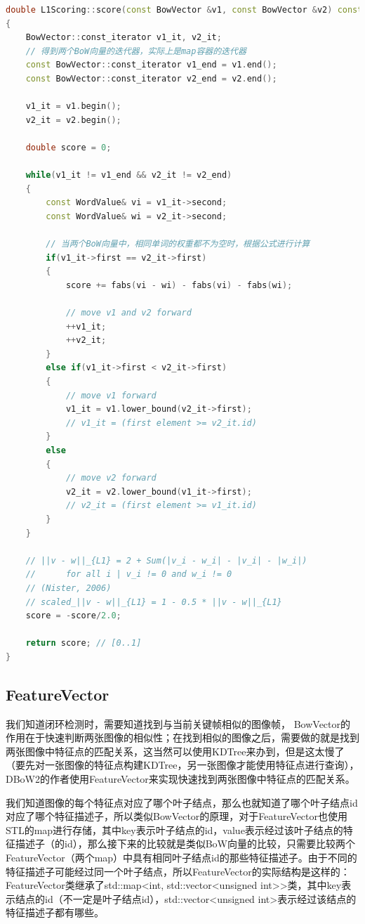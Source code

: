 \begin{lstlisting}[language = C++]
double L1Scoring::score(const BowVector &v1, const BowVector &v2) const
{
	BowVector::const_iterator v1_it, v2_it;
	// 得到两个BoW向量的迭代器，实际上是map容器的迭代器
	const BowVector::const_iterator v1_end = v1.end();
	const BowVector::const_iterator v2_end = v2.end();
	
	v1_it = v1.begin();
	v2_it = v2.begin();
	
	double score = 0;
	
	while(v1_it != v1_end && v2_it != v2_end)
	{
		const WordValue& vi = v1_it->second;
		const WordValue& wi = v2_it->second;
		
		// 当两个BoW向量中，相同单词的权重都不为空时，根据公式进行计算
		if(v1_it->first == v2_it->first)
		{
			score += fabs(vi - wi) - fabs(vi) - fabs(wi);
			
			// move v1 and v2 forward
			++v1_it;
			++v2_it;
		}
		else if(v1_it->first < v2_it->first)
		{
			// move v1 forward
			v1_it = v1.lower_bound(v2_it->first);
			// v1_it = (first element >= v2_it.id)
		}
		else
		{
			// move v2 forward
			v2_it = v2.lower_bound(v1_it->first);
			// v2_it = (first element >= v1_it.id)
		}
	}
	
	// ||v - w||_{L1} = 2 + Sum(|v_i - w_i| - |v_i| - |w_i|) 
	//		for all i | v_i != 0 and w_i != 0 
	// (Nister, 2006)
	// scaled_||v - w||_{L1} = 1 - 0.5 * ||v - w||_{L1}
	score = -score/2.0;
	
	return score; // [0..1]
}


\end{lstlisting}


\subsection{FeatureVector}
我们知道闭环检测时，需要知道找到与当前关键帧相似的图像帧，
BowVector的作用在于快速判断两张图像的相似性；在找到相似的图像之后，需要做的就是找到两张图像中特征点的匹配关系，这当然可以使用KDTree来办到，但是这太慢了（要先对一张图像的特征点构建KDTree，另一张图像才能使用特征点进行查询），DBoW2的作者使用FeatureVector来实现快速找到两张图像中特征点的匹配关系。


我们知道图像的每个特征点对应了哪个叶子结点，那么也就知道了哪个叶子结点id对应了哪个特征描述子，所以类似BowVector的原理，对于FeatureVector也使用STL的map进行存储，其中key表示叶子结点的id，value表示经过该叶子结点的特征描述子（的id），那么接下来的比较就是类似BoW向量的比较，只需要比较两个FeatureVector（两个map）中具有相同叶子结点id的那些特征描述子。由于不同的特征描述子可能经过同一个叶子结点，所以FeatureVector的实际结构是这样的：FeatureVector类继承了std::map<int, std::vector<unsigned int>>类，其中key表示结点的id（不一定是叶子结点id），std::vector<unsigned int>表示经过该结点的特征描述子都有哪些。

